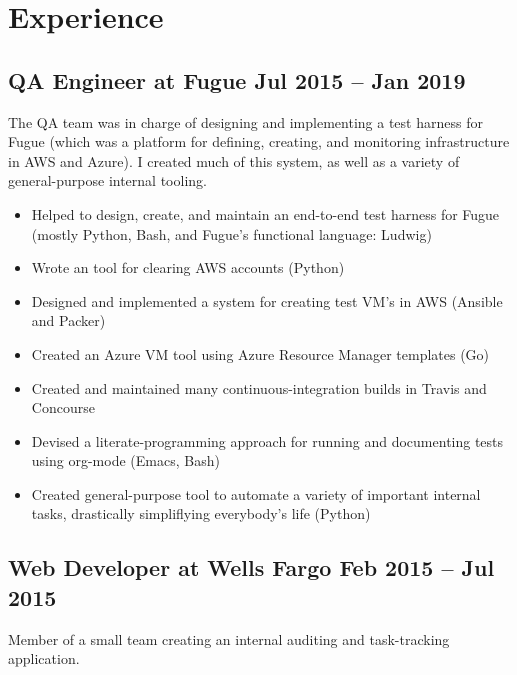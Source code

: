 \documentclass[12pt]{article}
\begin{document}

\section*{Experience}

\subsection*{QA Engineer at Fugue \hfill Jul 2015 -- Jan 2019}

The QA team was in charge of designing and implementing a test harness for Fugue
(which was a platform for defining, creating, and monitoring infrastructure in
AWS and Azure). I created much of this system, as well as a variety of
general-purpose internal tooling.

\begin{itemize}
\item Helped to design, create, and maintain an end-to-end test harness for
  Fugue (mostly Python, Bash, and Fugue's functional language: Ludwig)
\item Wrote an tool for clearing AWS accounts (Python)
\item Designed and implemented a system for creating test VM's in AWS (Ansible
  and Packer)
\item Created an Azure VM tool using Azure Resource Manager templates (Go)
\item Created and maintained many continuous-integration builds in Travis and
  Concourse
\item Devised a literate-programming approach for running and documenting tests
  using org-mode (Emacs, Bash)
\item Created general-purpose tool to automate a variety of important internal
  tasks, drastically simpliflying everybody's life (Python)
\end{itemize}

     
 

\subsection*{Web Developer at Wells Fargo \hfill Feb 2015 -- Jul 2015}

Member of a small team creating an internal auditing and task-tracking
application.
\end{document}
